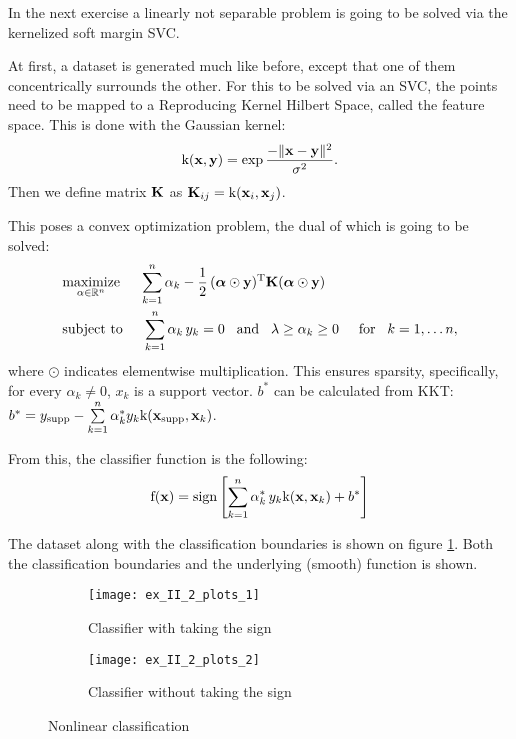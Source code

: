 In the next exercise a linearly not separable problem is going to be solved
via the kernelized soft margin SVC.

At first, a dataset is generated much like before, except that one of them concentrically
surrounds the other. For this to be solved via an SVC, the points need to be mapped
to a Reproducing Kernel Hilbert Space, called the feature space.
This is done with the Gaussian kernel:
\begin{equation}
	\mathrm{k}(\boldsymbol{\mathrm{x}}, \boldsymbol{\mathrm{y}}) = \exp\frac{-\lVert\boldsymbol{\mathrm{x}}-\boldsymbol{\mathrm{y}}\rVert^2}{\sigma^2}.
\end{equation}
Then we define matrix $\boldsymbol{\mathrm{K}}$ as $\boldsymbol{\mathrm{K}}_{ij} = \mathrm{k}(\boldsymbol{\mathrm{x}}_i, \boldsymbol{\mathrm{x}}_j)$.

This poses a convex optimization problem, the dual of which is going to be solved:
\begin{equation}
\begin{split}
	&\underset{\alpha\in\mathbb{R}^n}{\operatorname{maximize}}\hspace{5mm}
		\sum\limits_{k=1}^n\alpha_k - \frac{1}{2}\,(\boldsymbol{\mathrm{\alpha}}\odot\boldsymbol{\mathrm{y}})\textsuperscript{T}\boldsymbol{\mathrm{K}}(\boldsymbol{\mathrm{\alpha}}\odot\boldsymbol{\mathrm{y}})\\
	&\text{subject to}\hspace{5mm}
		\sum\limits_{k=1}^n\alpha_k\,y_k=0\hspace{3mm}\text{and}\hspace{3mm}\lambda\geq\alpha_k\geq0\hspace{5mm}\text{for}\hspace{3mm} k=1,\dots n,
\end{split}
\end{equation}
where $\odot$ indicates elementwise multiplication.
This ensures sparsity, specifically, for every $\alpha_k\neq0$, $x_k$ is a support vector.
$b^*$ can be calculated from KKT:
$b^* = y_\text{supp} - \sum\limits_{k=1}^n\alpha_k^*y_k\mathrm{k}(\boldsymbol{\mathrm{x}}_\text{supp}, \boldsymbol{\mathrm{x}}_k)$.

From this, the classifier function is the following:
\begin{equation}
	\mathrm{f}(\boldsymbol{\mathrm{x}}) = \operatorname{sign}\left[\sum\limits_{k=1}^n\alpha_k^*\,y_k\mathrm{k}(\boldsymbol{\mathrm{x}}, \boldsymbol{\mathrm{x}}_k) + b^*\right]
\end{equation}

The dataset along with the classification boundaries is shown on figure \ref{fig:kernel-SVC}.
Both the classification boundaries and the underlying (smooth) function is shown.

\begin{figure}[H]
	\centering
	\begin{subfigure}{.49\textwidth}
		\centering
		\texttt{[image: ex\_II\_2\_plots\_1]}
		\caption{Classifier with taking the sign}
	\end{subfigure}
	\begin{subfigure}{.49\textwidth}
		\centering
		\texttt{[image: ex\_II\_2\_plots\_2]}
		\caption{Classifier without taking the sign}
	\end{subfigure}
	\caption{Nonlinear classification}
	\label{fig:kernel-SVC}
\end{figure}

